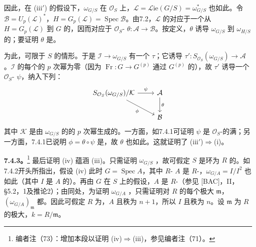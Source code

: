 因此，在 (iii$'$) 的假设下，$\omega_{G/S}$ 在 $\mathcal O_S$ 上，$\mathcal L=\mathscr{L}\mathrm{ie}(G/S)=\omega_{G/S}^*$ 也如此。令 $\mathcal B=U_p(\mathcal L)^*$，$H=G_p(\mathcal L)=\operatorname{Spec}\mathcal B$。由7.2，$\mathcal L$ 的对应于一个从 $H=G_p(\mathcal L)$ 到 $G$ 的，因而对应于 $\mathcal O_S$- $\theta:\mathcal A\to\mathcal B$。按定义，$\theta$ 诱导 $\omega_{G/S}$ 到 $\omega_{H/S}$ 的；要证明 $\theta$ 是。

为此，可限于 $S$ 的情形。于是 $\mathcal I\to\omega_{G/S}$ 有一个 $\tau$；它诱导 $\tau':S_{\mathcal O_S}(\omega_{G/S})\to\mathcal A$。$\mathcal I$ 的每个的 $p$ 次幂为零（因为 $\operatorname{Fr}:G\to G^{(p)}$ 通过 $G^{(p)}$ 的），故 $\tau'$ 诱导一个 $\mathcal O_S$- $\psi$，纳入下列：
\[
\begin{tikzcd}
 S_{\mathcal O_S}(\omega_{G/S})/\mathcal K\arrow[r,"\psi"]\arrow[dr,"\phi"']&\mathcal A\arrow[d,"\theta"]\\
 &\mathcal B
\end{tikzcd}
\]
其中 $\mathcal K$ 是由 $\omega_{G/S}$ 的的 $p$ 次幂生成的。一方面，如7.4.1可证明 $\psi$ 是 $\mathcal O_S$-的满；另一方面，7.4.1已说明 $\phi=\theta\circ\psi$ 是，故 $\theta$ 也如此。这就证明了 (iii$'$)$\Rightarrow$(i)。

\textbf{7.4.3。}\footnote{编者注（73）：增加本段以证明 (iv)$\Rightarrow$(iii)，参见编者注（71）。}
最后证明 (iv) 蕴涵 (iii)。只需证明 $\omega_{G/S}$ ，故可假定 $S$ 是环为 $R$ 的。如7.4.2开头所指出，假设 (iv) 此时 $G=\operatorname{Spec}A$，其中 $R$- $A$ 是 $R$-，$\omega_{G/A}=I/I^2$ 也如此（其中 $I$ 是 $A$ 的）。再由 $G$ 在 $S$ 上的假设，$A$ 是 $R$-（参见 [BAC]，II，\S5.2，1及推论2）；由同处，为证明 $\omega_{G/A}$ ，只需证明对 $R$ 的每个极大 $\mathfrak m$，$(\omega_{G/A})_{\mathfrak m}$ 都。因此可假定 $R$ 为，$A$ 且秩为 $n+1$，所以 $I$ 且秩为 $n$。设 $\mathfrak m$ 为 $R$ 的极大，$k=R/\mathfrak m$。

